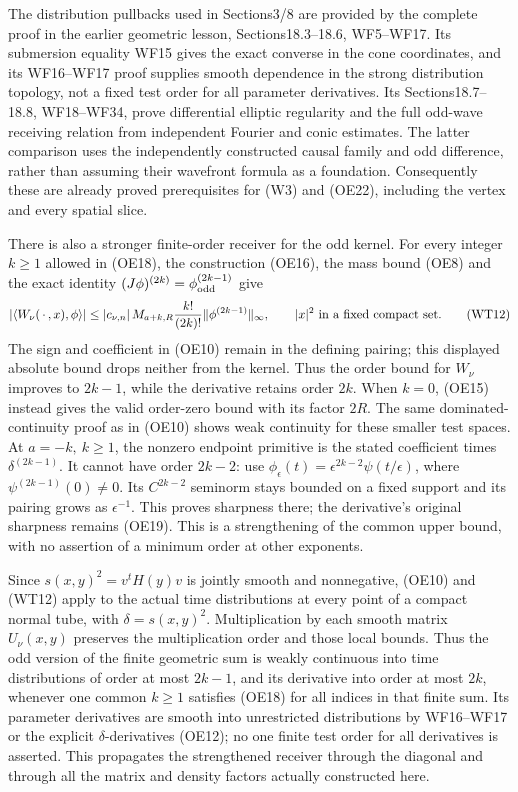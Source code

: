 \documentclass[
  11pt,
]{article}
\begin{document}
The distribution pullbacks used in Sections3/8 are provided by the
complete proof in the earlier geometric lesson, Sections18.3--18.6,
WF5--WF17. Its submersion equality WF15 gives the exact converse in the
cone coordinates, and its WF16--WF17 proof supplies smooth dependence in
the strong distribution topology, not a fixed test order for all
parameter derivatives. Its Sections18.7--18.8, WF18--WF34, prove
differential elliptic regularity and the full odd-wave receiving
relation from independent Fourier and conic estimates. The latter
comparison uses the independently constructed causal family and odd
difference, rather than assuming their wavefront formula as a
foundation. Consequently these are already proved prerequisites for (W3)
and (OE22), including the vertex and every spatial slice.

There is also a stronger finite-order receiver for the odd kernel. For
every integer \(k\geq1\) allowed in (OE18), the construction (OE16), the
mass bound (OE8) and the exact identity
\((J\phi)^{(2k)}=\phi_{\rm odd}^{(2k-1)}\) give \[
 |\langle W_\nu(\,\cdot\,,x),\phi\rangle|
 \leq |c_{\nu,n}|\,M_{a+k,R}\frac{k!}{(2k)!}
                        \|\phi^{(2k-1)}\|_\infty ,
 \qquad |x|^2\ \hbox{in a fixed compact set}.
 \tag{WT12}
\] The sign and coefficient in (OE10) remain in the defining pairing;
this displayed absolute bound drops neither from the kernel. Thus the
order bound for \(W_\nu\) improves to \(2k-1\), while the derivative
retains order \(2k\). When \(k=0\), (OE15) instead gives the valid
order-zero bound with its factor \(2R\). The same dominated-continuity
proof as in (OE10) shows weak continuity for these smaller test spaces.
At \(a=-k,\ k\geq1\), the nonzero endpoint primitive is the stated
coefficient times \(\delta^{(2k-1)}\). It cannot have order \(2k-2\):
use \(\phi_\epsilon(t)=\epsilon^{2k-2}\psi(t/\epsilon)\), where
\(\psi^{(2k-1)}(0)\ne0\). Its \(C^{2k-2}\) seminorm stays bounded on a
fixed support and its pairing grows as \(\epsilon^{-1}\). This proves
sharpness there; the derivative's original sharpness remains (OE19).
This is a strengthening of the common upper bound, with no assertion of
a minimum order at other exponents.

Since \(s(x,y)^2=v^tH(y)v\) is jointly smooth and nonnegative, (OE10)
and (WT12) apply to the actual time distributions at every point of a
compact normal tube, with \(\delta=s(x,y)^2\). Multiplication by each
smooth matrix \(U_\nu(x,y)\) preserves the multiplication order and
those local bounds. Thus the odd version of the finite geometric sum is
weakly continuous into time distributions of order at most \(2k-1\), and
its derivative into order at most \(2k\), whenever one common \(k\geq1\)
satisfies (OE18) for all indices in that finite sum. Its parameter
derivatives are smooth into unrestricted distributions by WF16--WF17 or
the explicit \(\delta\)-derivatives (OE12); no one finite test order for
all derivatives is asserted. This propagates the strengthened receiver
through the diagonal and through all the matrix and density factors
actually constructed here.
\end{document}
